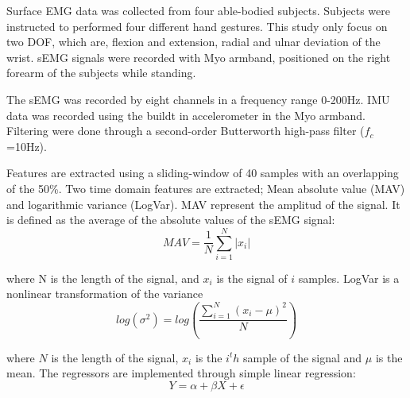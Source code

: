 \documentclass[landscape,a0paper,fontscale=0.375]{baposter} %
\begin{document}
\begin{poster}
{Surface EMG data was collected from four able-bodied subjects. Subjects were instructed to performed four different hand gestures. This study only focus on two DOF, which are, flexion and extension, radial and ulnar deviation of the wrist. sEMG signals were recorded with Myo armband, positioned on the right forearm of the subjects while standing.

The sEMG was recorded by eight channels in a frequency range 0-200Hz. IMU data was recorded using the buildt in accelerometer in the Myo armband. Filtering were done through a second-order Butterworth high-pass filter ($f_c$=10Hz). 

Features are extracted using a sliding-window of 40 samples with an overlapping of the 50\%. Two time domain features are extracted; Mean absolute value (MAV) and logarithmic variance (LogVar). MAV represent the amplitud of the signal. It is defined as the average of the absolute values of the sEMG signal:
\vspace{-0.2cm}
\begin{equation}
MAV = \frac{1}{N}\sum\limits_{i=1}^N|x_i|
\end{equation} \vspace{-0.1cm}

where N is the length of the signal, and $x_i$ is the signal of $i$ samples.
LogVar is a nonlinear transformation of the variance %
\vspace{-0.2cm}
\begin{equation} \label{eq:logvar}
log(\sigma^2) = log(\frac{\sum\limits_{i=1}^N(x_i - \mu)^2}{N})
\end{equation}\vspace{-0.1cm}

where $N$ is the length of the signal, $x_i$ is the $i^th$ sample of the signal and $\mu$ is the mean.
The regressors are implemented through simple linear regression:
\vspace{-0.1cm}
\begin{equation} \label{eq:simpleLinearRegression}
Y = \alpha + \beta X + \epsilon
\end{equation} \vspace{-0.1cm}

}
\end{poster}
\end{document}
